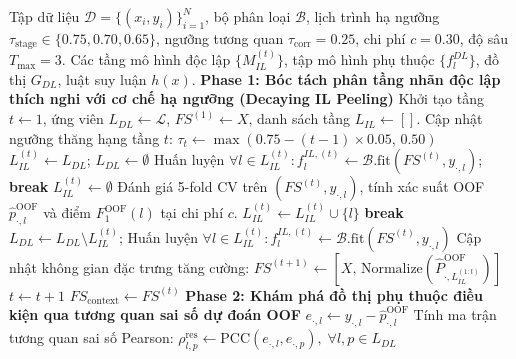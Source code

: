 \documentclass[10pt,a4paper,twoside]{article}
\begin{document}
\begin{algorithm}[H]
\caption{Quy trình huấn luyện và suy luận đa tầng GSI-MLC-PA v6.2.1}\label{alg:gsi_v621}
\begin{algorithmic}[1]
\Require Tập dữ liệu $\mathcal{D} = \{(x_i, y_i)\}_{i=1}^N$, bộ phân loại $\mathcal{B}$, lịch trình hạ ngưỡng $\tau_{\text{stage}} \in \{0.75, 0.70, 0.65\}$, ngưỡng tương quan $\tau_{\text{corr}} = 0.25$, chi phí $c = 0.30$, độ sâu $T_{\max} = 3$.
\Ensure Các tầng mô hình độc lập $\{M_{IL}^{(t)}\}$, tập mô hình phụ thuộc $\{f_l^{DL}\}$, đồ thị $G_{DL}$, luật suy luận $h(x)$.
\Statex \textbf{Phase 1: Bóc tách phân tầng nhãn độc lập thích nghi với cơ chế hạ ngưỡng (Decaying IL Peeling)}
\State Khởi tạo tầng $t \leftarrow 1$, ứng viên $L_{DL} \leftarrow \mathcal{L}$, $FS^{(1)} \leftarrow X$, danh sách tầng $L_{IL} \leftarrow []$.
    \State Cập nhật ngưỡng thăng hạng tầng $t$: $\tau_t \leftarrow \max(0.75 - (t-1)\times 0.05, \, 0.50)$
        \State $L_{IL}^{(t)} \leftarrow L_{DL}$; \quad $L_{DL} \leftarrow \emptyset$ 
        \State Huấn luyện $\forall l \in L_{IL}^{(t)}: f_l^{IL,(t)} \leftarrow \mathcal{B}.\text{fit}(FS^{(t)}, y_{\cdot, l})$; \quad \textbf{break}
    \EndIf
    \State $L_{IL}^{(t)} \leftarrow \emptyset$
        \State Đánh giá 5-fold CV trên $(FS^{(t)}, y_{\cdot, l})$, tính xác suất OOF $\hat{p}_{\cdot, l}^{\text{OOF}}$ và điểm $F_1^{\text{OOF}}(l)$ tại chi phí $c$.
            \State $L_{IL}^{(t)} \leftarrow L_{IL}^{(t)} \cup \{l\}$
        \EndIf
    \EndFor
        \State \textbf{break} 
    \EndIf
    \State $L_{DL} \leftarrow L_{DL} \setminus L_{IL}^{(t)}$; \quad Huấn luyện $\forall l \in L_{IL}^{(t)}: f_l^{IL,(t)} \leftarrow \mathcal{B}.\text{fit}(FS^{(t)}, y_{\cdot, l})$
    \State Cập nhật không gian đặc trưng tăng cường: $FS^{(t+1)} \leftarrow [X, \, \text{Normalize}(\hat{P}_{\cdot, L_{IL}^{(1:t)}}^{\text{OOF}})]$
    \State $t \leftarrow t + 1$
\EndWhile
\State $FS_{\text{context}} \leftarrow FS^{(t)}$
\Statex \textbf{Phase 2: Khám phá đồ thị phụ thuộc điều kiện qua tương quan sai số dự đoán OOF}
    \State $e_{\cdot, l} \leftarrow y_{\cdot, l} - \hat{p}_{\cdot, l}^{\text{OOF}}$
\EndFor
\State Tính ma trận tương quan sai số Pearson: $\rho_{l,p}^{\text{res}} \leftarrow \text{PCC}(e_{\cdot, l}, e_{\cdot, p}), \; \forall l, p \in L_{DL}$

\end{algorithmic}
\end{algorithm}
\end{document}
